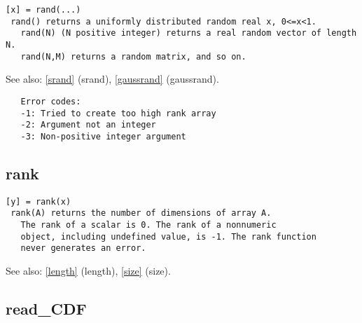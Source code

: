 \documentclass[a4paper]{article}
\begin{document}
\begin{tscreen}
\begin{verbatim}
[x] = rand(...)
 rand() returns a uniformly distributed random real x, 0<=x<1.
   rand(N) (N positive integer) returns a real random vector of length N.
   rand(N,M) returns a random matrix, and so on.
\end{verbatim}

See also: \ref{srand} {(srand)}, \ref{gaussrand} {(gaussrand)}.
\begin{verbatim}
   Error codes:
   -1: Tried to create too high rank array
   -2: Argument not an integer
   -3: Non-positive integer argument 
\end{verbatim}
\end{tscreen}





\subsection{rank\label{rank}}

\begin{tscreen}
\begin{verbatim}
[y] = rank(x)
 rank(A) returns the number of dimensions of array A.
   The rank of a scalar is 0. The rank of a nonnumeric
   object, including undefined value, is -1. The rank function
   never generates an error.
\end{verbatim}

See also: \ref{length} {(length)}, \ref{size} {(size)}.
\end{tscreen}





\subsection{read\_CDF\label{read_CDF}}
\end{document}
